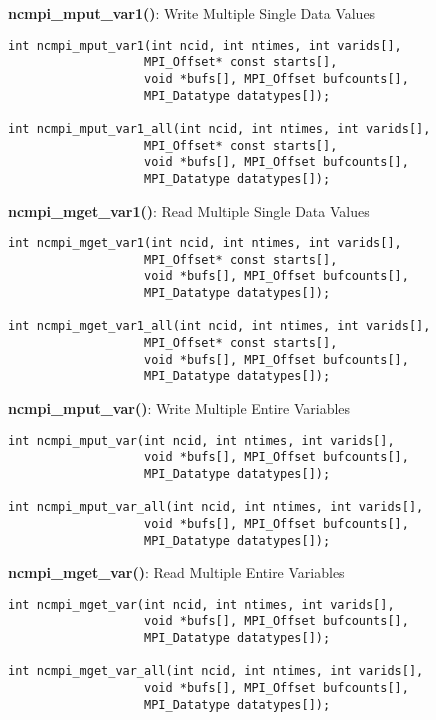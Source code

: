 {\bf ncmpi\_mput\_var1()}: Write Multiple Single Data Values

\begin{verbatim}
int ncmpi_mput_var1(int ncid, int ntimes, int varids[],
                   MPI_Offset* const starts[],
                   void *bufs[], MPI_Offset bufcounts[],
                   MPI_Datatype datatypes[]);

int ncmpi_mput_var1_all(int ncid, int ntimes, int varids[], 
                   MPI_Offset* const starts[],
                   void *bufs[], MPI_Offset bufcounts[],
                   MPI_Datatype datatypes[]);
\end{verbatim}


{\bf ncmpi\_mget\_var1()}: Read Multiple Single Data Values

\begin{verbatim}
int ncmpi_mget_var1(int ncid, int ntimes, int varids[], 
                   MPI_Offset* const starts[],
                   void *bufs[], MPI_Offset bufcounts[],
                   MPI_Datatype datatypes[]);

int ncmpi_mget_var1_all(int ncid, int ntimes, int varids[], 
                   MPI_Offset* const starts[],
                   void *bufs[], MPI_Offset bufcounts[],
                   MPI_Datatype datatypes[]);
\end{verbatim}


{\bf ncmpi\_mput\_var()}: Write Multiple Entire Variables

\begin{verbatim}
int ncmpi_mput_var(int ncid, int ntimes, int varids[],
                   void *bufs[], MPI_Offset bufcounts[],
                   MPI_Datatype datatypes[]);

int ncmpi_mput_var_all(int ncid, int ntimes, int varids[], 
                   void *bufs[], MPI_Offset bufcounts[],
                   MPI_Datatype datatypes[]);
\end{verbatim}


{\bf ncmpi\_mget\_var()}: Read Multiple Entire Variables

\begin{verbatim}
int ncmpi_mget_var(int ncid, int ntimes, int varids[], 
                   void *bufs[], MPI_Offset bufcounts[],
                   MPI_Datatype datatypes[]);

int ncmpi_mget_var_all(int ncid, int ntimes, int varids[], 
                   void *bufs[], MPI_Offset bufcounts[],
                   MPI_Datatype datatypes[]);
\end{verbatim}


